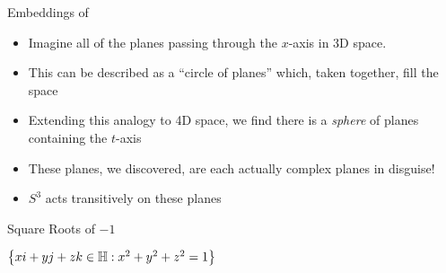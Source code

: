 \documentclass[t,slidestop,compress,mathserif,color=option,hyperref={pdfstartview={Fit},pdfpagelayout={SinglePage},pdfpagemode={UseOutlines}}]{beamer}
\begin{document}
%

\begin{frame}{Embeddings of \bC}
    \begin{itemize}
        \item Imagine all of the planes passing through the $x$-axis in 3D space. 
        \item This can be described as a ``circle of planes'' which, taken together, fill the space
        \item Extending this analogy to 4D space, we find there is a {\it sphere} of planes containing the $t$-axis
        \item These planes, we discovered, are each actually complex planes in disguise!
        \item $S^3$ acts transitively on these planes
    \end{itemize}
    
    \begin{block}{Square Roots of $-1$}
    \begin{center}
        $\left\{ xi + yj + zk \in \protect\mathbb{H} : x^2 + y^2 + z^2 = 1 \right\}$
    \end{center}
    \end{block}
\end{frame}
\end{document}
